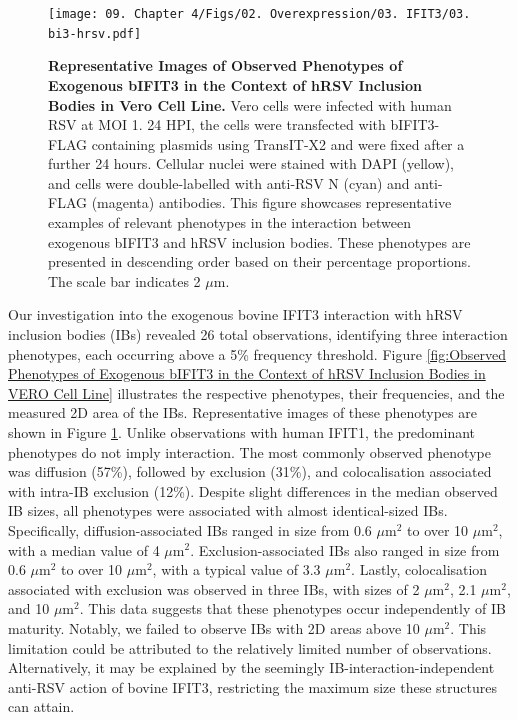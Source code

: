\begin{figure}
    \centering
    \texttt{[image: 09. Chapter 4/Figs/02. Overexpression/03. IFIT3/03. bi3-hrsv.pdf]}
    \caption[Representative Images of Observed Phenotypes of Exogenous bIFIT3 in the Context of hRSV Inclusion Bodies in Vero Cell Line.]{\textbf{Representative Images of Observed Phenotypes of Exogenous bIFIT3 in the Context of hRSV Inclusion Bodies in Vero Cell Line.} Vero cells were infected with human RSV at MOI 1. 24 HPI, the cells were transfected with bIFIT3-FLAG containing plasmids using TransIT-X2 and were fixed after a further 24 hours. Cellular nuclei were stained with DAPI (yellow), and cells were double-labelled with anti-RSV N (cyan) and anti-FLAG (magenta) antibodies. This figure showcases representative examples of relevant phenotypes in the interaction between exogenous bIFIT3 and hRSV inclusion bodies. These phenotypes are presented in descending order based on their percentage proportions. The scale bar indicates 2 \(\mu \mbox{m}\).}
    \label{fig:Representative Images of Observed Phenotypes of Exogenous bIFIT3 in the Context of hRSV Inclusion Bodies in VERO Cell Line}
\end{figure}

Our investigation into the exogenous bovine IFIT3 interaction with hRSV inclusion bodies (IBs) revealed 26 total observations, identifying three interaction phenotypes, each occurring above a 5\% frequency threshold. Figure \ref{fig:Observed Phenotypes of Exogenous bIFIT3 in the Context of hRSV Inclusion Bodies in VERO Cell Line} illustrates the respective phenotypes, their frequencies, and the measured 2D area of the IBs. Representative images of these phenotypes are shown in Figure \ref{fig:Representative Images of Observed Phenotypes of Exogenous bIFIT3 in the Context of hRSV Inclusion Bodies in VERO Cell Line}. Unlike observations with human IFIT1, the predominant phenotypes do not imply interaction. The most commonly observed phenotype was diffusion (57\%), followed by exclusion (31\%), and colocalisation associated with intra-IB exclusion (12\%). Despite slight differences in the median observed IB sizes, all phenotypes were associated with almost identical-sized IBs. Specifically, diffusion-associated IBs ranged in size from 0.6 \(\mu \mbox{m}^2\) to over 10 \(\mu \mbox{m}^2\), with a median value of 4 \(\mu \mbox{m}^2\). Exclusion-associated IBs also ranged in size from 0.6 \(\mu \mbox{m}^2\) to over 10 \(\mu \mbox{m}^2\), with a typical value of 3.3 \(\mu \mbox{m}^2\). Lastly, colocalisation associated with exclusion was observed in three IBs, with sizes of 2 \(\mu \mbox{m}^2\), 2.1 \(\mu \mbox{m}^2\), and 10 \(\mu \mbox{m}^2\). This data suggests that these phenotypes occur independently of IB maturity. Notably, we failed to observe IBs with 2D areas above 10 \(\mu \mbox{m}^2\). This limitation could be attributed to the relatively limited number of observations. Alternatively, it may be explained by the seemingly IB-interaction-independent anti-RSV action of bovine IFIT3, restricting the maximum size these structures can attain.

